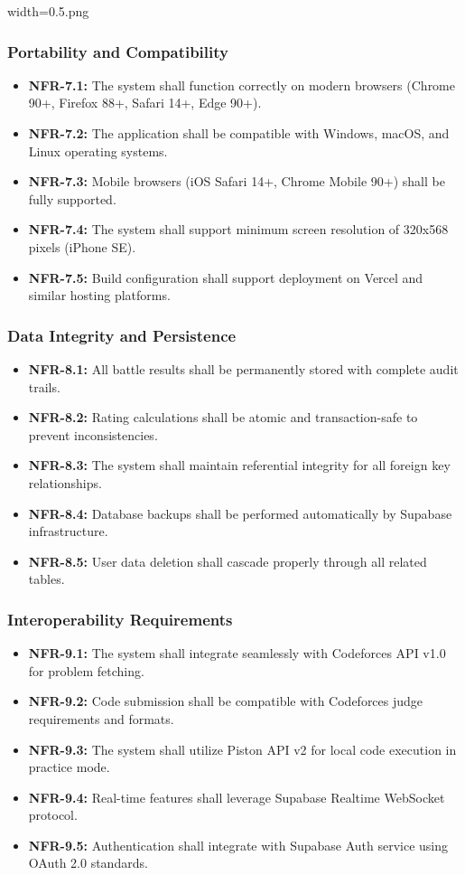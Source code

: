 width=0.5\linewidthimage.png\documentclass[12pt,a4paper]{article}
\begin{document}
\subsubsection{Portability and Compatibility}
\begin{itemize}
\item \textbf{NFR-7.1:} The system shall function correctly on modern browsers (Chrome 90+, Firefox 88+, Safari 14+, Edge 90+).
\item \textbf{NFR-7.2:} The application shall be compatible with Windows, macOS, and Linux operating systems.
\item \textbf{NFR-7.3:} Mobile browsers (iOS Safari 14+, Chrome Mobile 90+) shall be fully supported.
\item \textbf{NFR-7.4:} The system shall support minimum screen resolution of 320x568 pixels (iPhone SE).
\item \textbf{NFR-7.5:} Build configuration shall support deployment on Vercel and similar hosting platforms.
\end{itemize}

\subsubsection{Data Integrity and Persistence}
\begin{itemize}
\item \textbf{NFR-8.1:} All battle results shall be permanently stored with complete audit trails.
\item \textbf{NFR-8.2:} Rating calculations shall be atomic and transaction-safe to prevent inconsistencies.
\item \textbf{NFR-8.3:} The system shall maintain referential integrity for all foreign key relationships.
\item \textbf{NFR-8.4:} Database backups shall be performed automatically by Supabase infrastructure.
\item \textbf{NFR-8.5:} User data deletion shall cascade properly through all related tables.
\end{itemize}

\subsubsection{Interoperability Requirements}
\begin{itemize}
\item \textbf{NFR-9.1:} The system shall integrate seamlessly with Codeforces API v1.0 for problem fetching.
\item \textbf{NFR-9.2:} Code submission shall be compatible with Codeforces judge requirements and formats.
\item \textbf{NFR-9.3:} The system shall utilize Piston API v2 for local code execution in practice mode.
\item \textbf{NFR-9.4:} Real-time features shall leverage Supabase Realtime WebSocket protocol.
\item \textbf{NFR-9.5:} Authentication shall integrate with Supabase Auth service using OAuth 2.0 standards.
\end{itemize}
\end{document}
